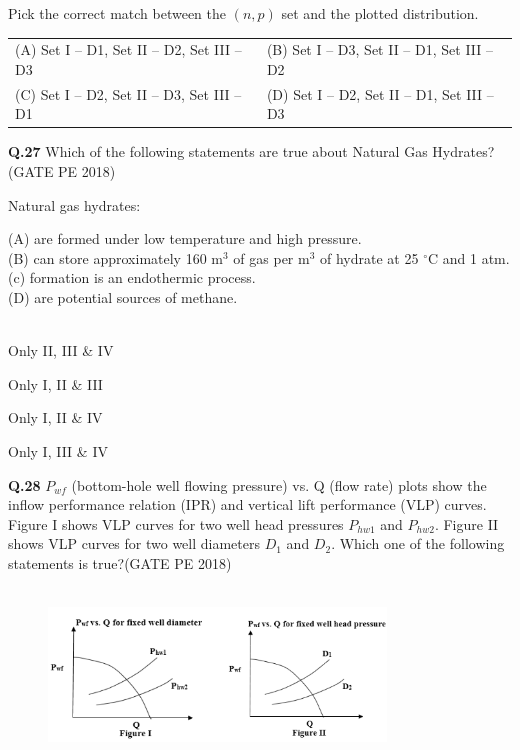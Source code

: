 \documentclass[12pt,a4paper]{article}
\begin{document}
Pick the correct match between the $(n, p)$ set and the plotted distribution.

\begin{tabular}{ll}
(A) Set I – D1, Set II – D2, Set III – D3 & (B) Set I – D3, Set II – D1, Set III – D2 \\
(C) Set I – D2, Set II – D3, Set III – D1 & (D) Set I – D2, Set II – D1, Set III – D3 \\
\end{tabular}

\pagebreak

\noindent\textbf{Q.27} Which of the following statements are true about Natural Gas Hydrates?
\hfill (GATE PE 2018)

\vspace{0.2cm}
Natural gas hydrates:


\noindent
(A) are formed under low temperature and high pressure.\\
(B) can store approximately 160 m$^3$ of gas per m$^3$ of hydrate at 25 $^\circ$C and 1 atm.\\
(c) formation is an endothermic process.\\
(D) are potential sources of methane.\\\\


\begin{enumerate}[label=(\Alph*)] 
\begin{multicols}{2}

\item Only II, III \& IV \item Only I, II \& III
\item Only I, II \& IV  \item Only I, III \& IV 
\end{multicols}
\end{enumerate}

\noindent
\textbf{Q.28} $P_{wf}$ (bottom-hole well flowing pressure) vs. Q (flow rate) plots show the inflow
performance relation (IPR) and vertical lift performance (VLP) curves. Figure I shows
VLP curves for two well head pressures $P_{hw1}$ and $P_{hw2}$. Figure II shows VLP curves for two
well diameters $D_1$ and $D_2$. Which one of the following statements is true?\hfill(GATE PE 2018)\\\\

\begin{figure}[h!]
  \centering
  \includegraphics[width=0.8\textwidth]{pic9.png} 
\end{figure}
\end{document}
